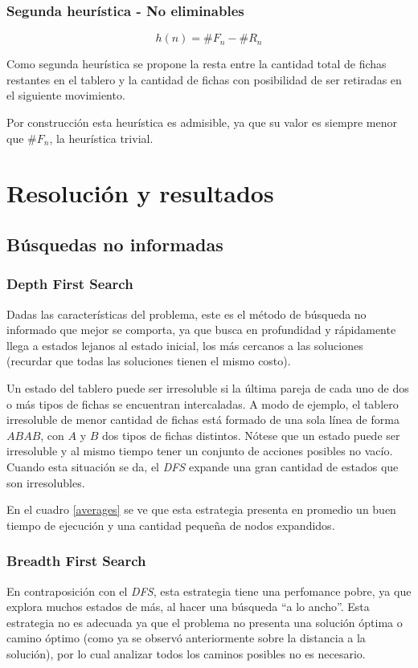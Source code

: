\documentclass[a4paper,10pt]{article}
\begin{document}
\begin{itemize}
    \subsubsection{Segunda heurística - No eliminables}

    \[ h(n) = \# F_n - \# R_n\] 

    Como segunda heurística se propone la resta entre la cantidad total de fichas restantes en el tablero y la cantidad de fichas con posibilidad de ser retiradas en el siguiente movimiento.

    Por construcción esta heurística es admisible, ya que su valor es siempre menor que $\#F_n$, la heurística trivial.

\section{Resolución y resultados}

\subsection{Búsquedas no informadas}

    \subsubsection{Depth First Search}
    \label{sec:dfs}
    Dadas las características del problema, este es el método de búsqueda no informado que mejor se comporta, ya que busca en profundidad y rápidamente llega a estados lejanos al estado inicial, los más cercanos a las soluciones (recurdar que todas las soluciones tienen el mismo costo).

    Un estado del tablero puede ser irresoluble si la última pareja de cada uno de dos o más tipos de fichas se encuentran intercaladas. A modo de ejemplo, el tablero irresoluble de menor cantidad de fichas está formado de una sola línea de forma $ABAB$, con $A$ y $B$ dos tipos de fichas distintos. Nótese que un estado puede ser irresoluble y al mismo tiempo tener un conjunto de acciones posibles no vacío. Cuando esta situación se da, el \textit{DFS} expande una gran cantidad de estados que son irresolubles.

    En el cuadro \ref{averages} se ve que esta estrategia presenta en promedio un buen tiempo de ejecución y una cantidad pequeña de nodos expandidos.
    
    \subsubsection{Breadth First Search}
    En contraposición con el \textit{DFS}, esta estrategia tiene una perfomance pobre, ya que explora muchos estados de más, al hacer una búsqueda ``a lo ancho''. Esta estrategia no es adecuada ya que el problema no presenta una solución óptima o camino óptimo (como ya se observó anteriormente sobre la distancia a la solución), por lo cual analizar todos los caminos posibles no es necesario.


\end{itemize}
\end{document}
